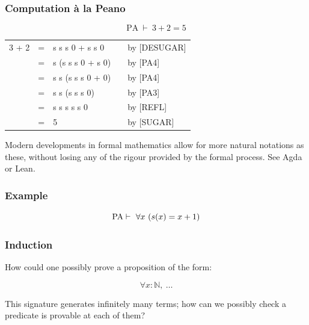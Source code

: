 \documentclass{beamer}
\theoremstyle{indentDefn} \newtheorem{defn}[]{Definition}
\begin{document}
\begin{frame}
	\frametitle{Computation \`{a} la Peano}

	$$ \text{PA} \ \vdash \ 3 + 2 = 5$$

	\begin{tabular}{r c l c l}
		3 + 2 & = & s s s 0 + s s 0   & & by [DESUGAR] \\
		      & = & s (s s s 0 + s 0) & & by [PA4] \\
			  & = & s s (s s s 0 + 0) & & by [PA4] \\
			  & = & s s (s s s 0)	  & & by [PA3] \\
			  & = & s s s s s 0		  & & by [REFL] \\
			  & = & 5				  & & by [SUGAR]
	\end{tabular}



	\vspace{25mm}

	Modern developments in formal mathematics allow for more natural notations as these, without losing any of the rigour provided by the formal process. See Agda or Lean. 
\end{frame}

\begin{frame}
	\frametitle{Example}

	$$ \text{PA} \vdash \ \forall x \ (s(x) = x + 1)$$

	\vspace{65mm}

\end{frame}

\begin{frame}
	\frametitle{Induction}

	How could one possibly prove a proposition of the form: 

	$$\forall x : \mathbb{N}, \ \dots$$

	This signature generates infinitely many terms; how can we possibly check a predicate is provable at each of them? 

	\vspace{40mm}
\end{frame}
\end{document}
